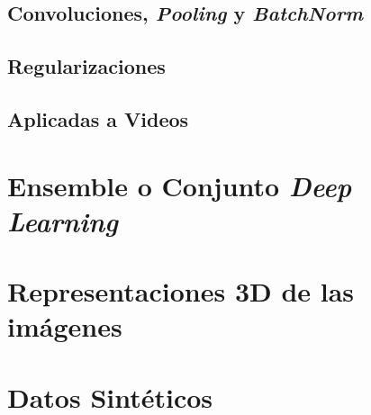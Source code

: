 \subsection{Convoluciones, \emph{Pooling} y \emph{BatchNorm}}
\subsection{Regularizaciones}
\subsection{Aplicadas a Videos} 
\section{Ensemble o Conjunto \emph{Deep Learning}}
\section{Representaciones 3D de las imágenes}
\section{Datos Sintéticos}
